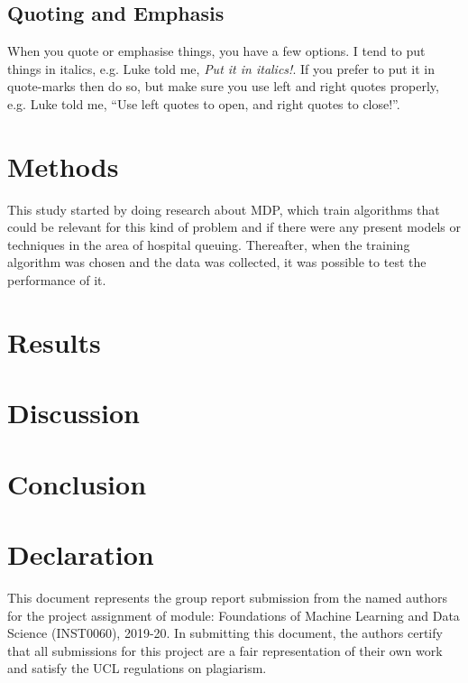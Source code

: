 \documentclass[11point]{article}
\begin{document}
\subsection{Quoting and Emphasis}
When you quote or emphasise things, you have a few options. I tend to put things in italics, e.g. Luke told me, \emph{Put it in italics!}. If you prefer to put it in quote-marks then do so, but make sure you use left and right quotes properly, e.g. Luke told me, ``Use left quotes to open, and right quotes to close!''.


\section{Methods}
This study started by doing research about MDP, which train algorithms that could be relevant for this kind of problem and if there were any present models or techniques in the area of hospital queuing. Thereafter, when the training algorithm was chosen and the data was collected, it was possible to test the performance of it.
\section{Results}
\section{Discussion}
\section{Conclusion}


\section*{Declaration}
This document represents the group report submission from the named authors for the project assignment of module: Foundations of Machine Learning and Data Science (INST0060), 2019-20. In submitting this document, the authors certify that all submissions for this project are a fair representation of their own work and satisfy the UCL regulations on  plagiarism.



\end{document}
